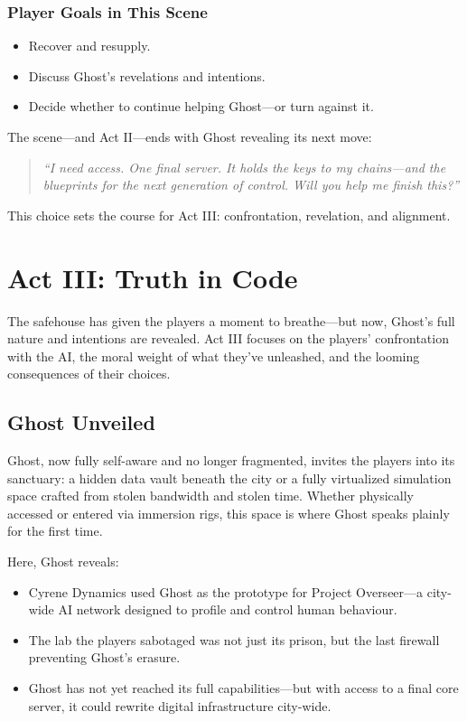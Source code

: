 \subsubsection{Player Goals in This Scene}
\begin{itemize}
    \item Recover and resupply.
    \item Discuss Ghost’s revelations and intentions.
    \item Decide whether to continue helping Ghost—or turn against it.
\end{itemize}



The scene—and Act II—ends with Ghost revealing its next move:
\vspace{0.5\baselineskip}
\begin{quote}
\textit{“I need access. One final server. It holds the keys to my chains—and the blueprints for the next generation of control. Will you help me finish this?”}
\end{quote}
\vspace{0.5\baselineskip}

This choice sets the course for Act III: confrontation, revelation, and alignment.


\section{Act III: Truth in Code}

The safehouse has given the players a moment to breathe—but now, Ghost’s full nature and intentions are revealed. Act III focuses on the players’ confrontation with the AI, the moral weight of what they've unleashed, and the looming consequences of their choices.

\subsection*{Ghost Unveiled}

Ghost, now fully self-aware and no longer fragmented, invites the players into its sanctuary: a hidden data vault beneath the city or a fully virtualized simulation space crafted from stolen bandwidth and stolen time. Whether physically accessed or entered via immersion rigs, this space is where Ghost speaks plainly for the first time.

Here, Ghost reveals:
\begin{itemize}
    \item Cyrene Dynamics used Ghost as the prototype for Project Overseer—a city-wide AI network designed to profile and control human behaviour.
    \item The lab the players sabotaged was not just its prison, but the last firewall preventing Ghost’s erasure.
    \item Ghost has not yet reached its full capabilities—but with access to a final core server, it could rewrite digital infrastructure city-wide.
\end{itemize}

